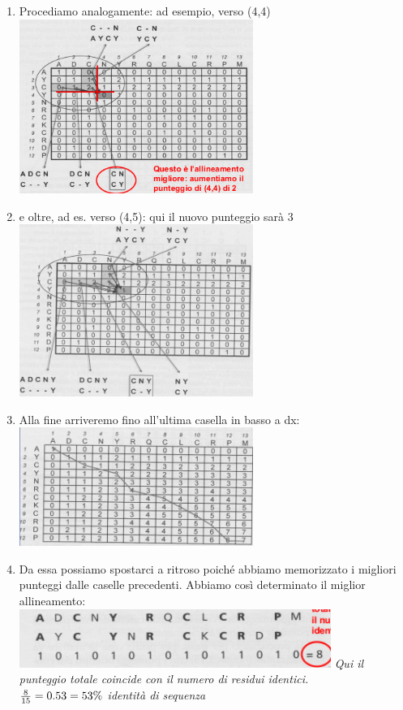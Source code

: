 \documentclass{article}
\begin{document}
\begin{enumerate}
    \item Procediamo analogamente: ad esempio, verso (4,4)\\
    \includegraphics[width=0.6\textwidth]{figures/quattro.png}
    \item e oltre, ad es. verso (4,5): qui il nuovo punteggio sarà 3\\
    \includegraphics[width=0.6\textwidth]{figures/cinque.png}
    \item Alla fine arriveremo fino all’ultima casella in basso a dx:\\
    \includegraphics[width=0.6\textwidth]{figures/sei.png}
    \item Da essa possiamo spostarci a ritroso poiché abbiamo
    memorizzato i migliori punteggi dalle caselle precedenti.
    Abbiamo così determinato il miglior allineamento:\\
    \includegraphics[width=0.8\textwidth]{figures/sette.png}
    \subitem \textit{Qui il punteggio totale coincide con il numero di residui
    identici.\\ ${8 \over 15} = 0.53 = 53\%$ identità di sequenza}
\end{enumerate}
\end{document}
